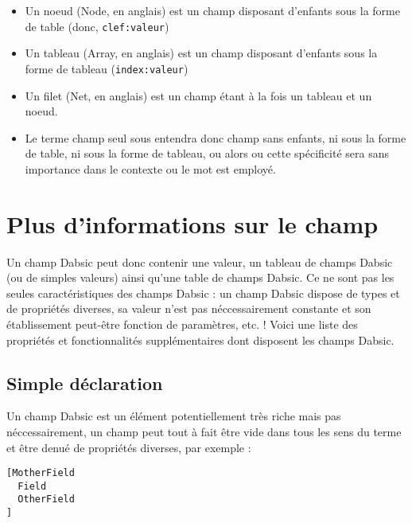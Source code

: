 \documentclass[a5paper, 12pt]{book}
\begin{document}
\begin{itemize}
  \item Un noeud (Node, en anglais) est un champ disposant
    d'enfants sous la forme de table (donc, \verb!clef:valeur!)
    \vspace{\baselineskip}
  \item Un tableau (Array, en anglais) est un champ disposant
    d'enfants sous la forme de tableau (\verb!index:valeur!)
    \vspace{\baselineskip}
   \item Un filet (Net, en anglais) est un champ étant à la fois
    un tableau et un noeud.
    \vspace{\baselineskip}
  \item Le terme champ seul sous entendra donc champ sans
    enfants, ni sous la forme de table, ni sous la forme de
    tableau, ou alors ou cette spécificité sera sans importance
    dans le contexte ou le mot est employé.
    \vspace{\baselineskip}
\end{itemize}

\newpage

\section{Plus d'informations sur le champ}

Un champ Dabsic peut donc contenir une valeur, un tableau
de champs Dabsic (ou de simples valeurs) ainsi qu'une table
de champs Dabsic. Ce ne sont pas les seules caractéristiques
des champs Dabsic : un champ Dabsic dispose de types et
de propriétés diverses, sa valeur n'est pas néccessairement
constante et son établissement peut-être fonction de
paramètres, etc. ! Voici une liste des propriétés et fonctionnalités
supplémentaires dont disposent les champs Dabsic.

\subsection{Simple déclaration}

Un champ Dabsic est un élément potentiellement très riche mais
pas néccessairement, un champ peut tout à fait être vide dans
tous les sens du terme et être denué de propriétés diverses, par
exemple :

\begin{verbatim}
[MotherField
  Field
  OtherField
]
\end{verbatim}
\end{document}
